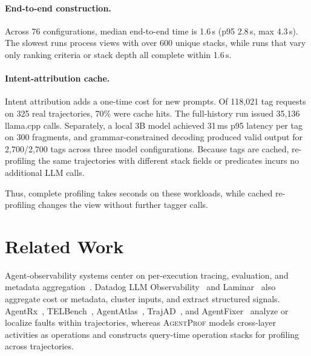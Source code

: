 \documentclass[letterpaper]{article}
\newcommand{\sys}{\textsc{AgentProf}\xspace}
\begin{document}
\paragraph{End-to-end construction.}
Across 76 configurations, median end-to-end time is 1.6\,s (p95 2.8\,s, max 4.3\,s).
The slowest runs process views with over 600 unique stacks, while runs that vary only ranking criteria or stack depth all complete within 1.6\,s.

\paragraph{Intent-attribution cache.}
Intent attribution adds a one-time cost for new prompts.
Of 118{,}021 tag requests on 325 real trajectories, 70\% were cache hits. The
full-history run issued 35{,}136 llama.cpp calls.
Separately, a local 3B model achieved 31\,ms p95 latency per tag on 300
fragments, and grammar-constrained decoding produced valid output for
2{,}700/2{,}700 tags across three model configurations.
Because tags are cached, re-profiling the same trajectories with different stack fields or predicates incurs no additional LLM calls.

Thus, complete profiling takes seconds on these workloads, while cached
re-profiling changes the view without further tagger calls.


\section{Related Work}

Agent-observability systems center on per-execution tracing, evaluation, and
metadata aggregation~\cite{langsmith,langfuse,phoenix,otel,openinference,agentops,agenttelemetry,agenttraces-trust}.
Datadog LLM Observability~\cite{datadog-llmobs} and
Laminar~\cite{laminar-signals} also aggregate cost or metadata, cluster inputs,
and extract structured signals.
AgentRx~\cite{agentrx}, TELBench~\cite{telbench},
AgentAtlas~\cite{agentatlas}, TrajAD~\cite{trajad}, and
AgentFixer~\cite{agentfixer} analyze or localize faults within trajectories, whereas
\sys models cross-layer activities as operations and constructs query-time
operation stacks for profiling across trajectories.
\end{document}
